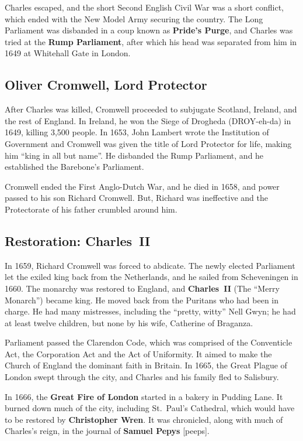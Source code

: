 Charles escaped, and the short Second English Civil War was a short conflict,
which ended with the New Model Army securing the country.
The Long Parliament was disbanded in a coup known as \textbf{Pride's Purge},
and Charles was tried at the \textbf{Rump Parliament},
after which his head was separated from him in 1649 at Whitehall Gate in London.

\subsection*{Oliver Cromwell, Lord Protector}

After Charles was killed, Cromwell proceeded to subjugate Scotland, Ireland, and the rest of England.
In Ireland, he won the Siege of Drogheda (DROY-eh-da) in 1649, killing 3,500 people.
In 1653, John Lambert wrote the Institution of Government
and Cromwell was given the title of Lord Protector for life,
making him ``king in all but name''.
He disbanded the Rump Parliament, and he established the Barebone's Parliament.

Cromwell ended the First Anglo-Dutch War, and he died in 1658,
and power passed to his son Richard Cromwell.
But, Richard was ineffective and the Protectorate of his father crumbled around him.

\subsection*{Restoration: Charles~II}

In 1659, Richard Cromwell was forced to abdicate.
The newly elected Parliament let the exiled king back from the Netherlands,
and he sailed from Scheveningen in 1660.
The monarchy was restored to England, and \textbf{Charles~II} (The ``Merry Monarch'') became king.
He moved back from the Puritans who had been in charge.
He had many mistresses, including the ``pretty, witty'' Nell Gwyn;
he had at least twelve children, but none by his wife, Catherine of Braganza.

Parliament passed the Clarendon Code, which was comprised of
the Conventicle Act,
the Corporation Act
and the Act of Uniformity.
It aimed to make the Church of England the dominant faith in Britain.
In 1665, the Great Plague of London swept through the city,
and Charles and his family fled to Salisbury.

In 1666, the \textbf{Great Fire of London} started in a bakery in Pudding Lane.
It burned down much of the city, including St.\ Paul's Cathedral,
which would have to be restored by \textbf{Christopher Wren}.
It was chronicled, along with much of Charles's reign, in the journal of \textbf{Samuel Pepys} [peeps].

